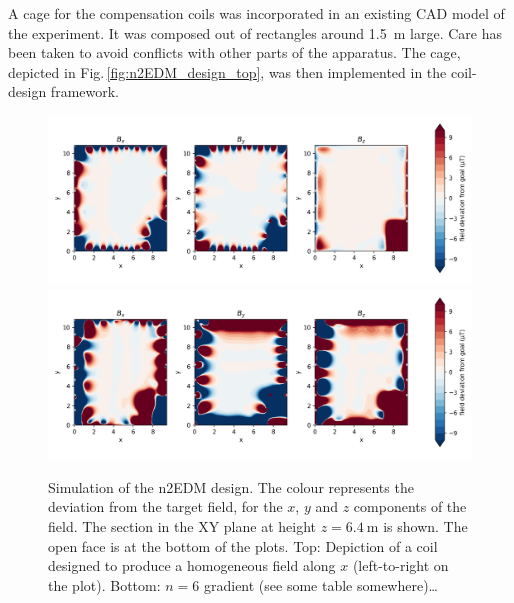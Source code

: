 A cage for the compensation coils was incorporated in an existing CAD model of the experiment.
It was composed out of rectangles around \SI{1.5}{\metre} large.
Care has been taken to avoid conflicts with other parts of the apparatus.
The cage, depicted in Fig.\,\ref{fig:n2EDM_design_top}, was then implemented in the coil-design framework.

\begin{figure}
  \centering
  \includegraphics[width=\linewidth]{gfx/prototype/n2EDM_field_Xcoil_XY_z6_4.png}
  \includegraphics[width=\linewidth]{gfx/prototype/n2EDM_field_n6coil_XY_z6_4.png}
  \caption{Simulation of the n2EDM design.
  The colour represents the deviation from the target field, for the $x$, $y$ and $z$ components of the field.
  The section in the XY plane at height $z=\SI{6.4}{\meter}$ is shown.
  The open face is at the bottom of the plots.
  Top: Depiction of a coil designed to produce a homogeneous field along $x$ (left-to-right on the plot).
  Bottom: $n=6$ gradient (see some table somewhere)\ldots {}}\label{fig:n2EDM_design_fields}
\end{figure}

